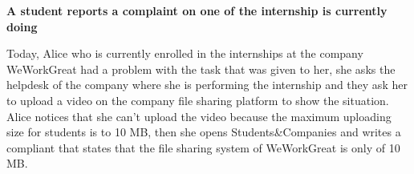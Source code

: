 		\textbf{A student reports a complaint on one of the internship is currently doing}
		\begin{flushleft}
			Today, Alice who is currently enrolled in the internships at the company WeWorkGreat had a problem with the task that was given to her, she asks the helpdesk of the company where she is performing the internship and they ask her to upload a video on the company file sharing platform to show the situation. Alice notices that she can’t upload the video because the maximum uploading size for students is to 10 MB, then she opens Students\&Companies and writes a compliant that states that the file sharing system of WeWorkGreat is only of 10 MB.
		\end{flushleft}